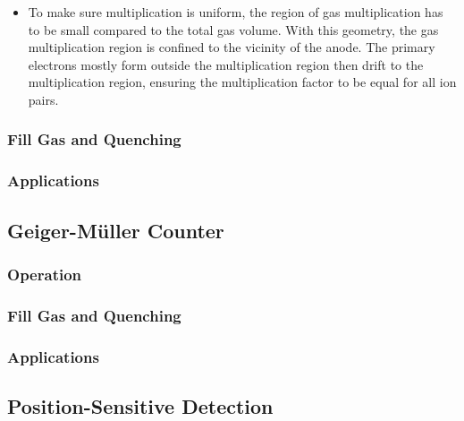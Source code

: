 \begin{itemize}
\begin{itemize}
        \item To make sure multiplication is uniform, the region of gas multiplication has to be small compared to the total gas volume. With this geometry, the gas multiplication region is confined to the vicinity of the anode. The primary electrons mostly form outside the multiplication region then drift to the multiplication region, ensuring the multiplication factor to be equal for all ion pairs. 
    \end{itemize}
\end{itemize}
\subsubsection{Fill Gas and Quenching}

\subsubsection{Applications}

\subsection{Geiger-Müller Counter}
\subsubsection{Operation}
\subsubsection{Fill Gas and Quenching}
\subsubsection{Applications}
\subsection{Position-Sensitive Detection}
